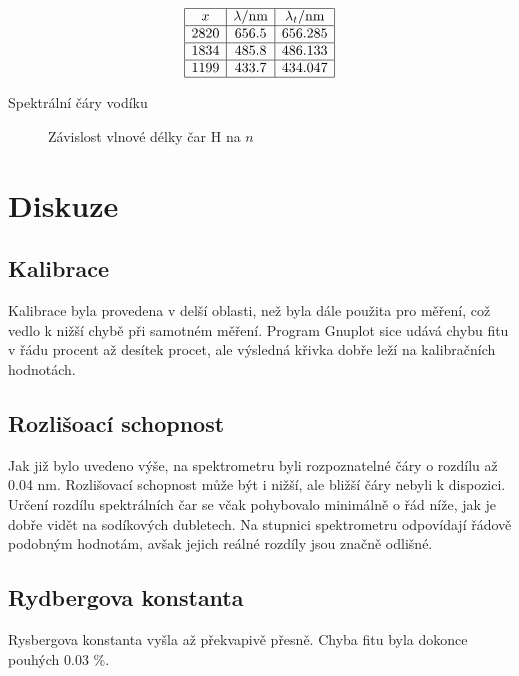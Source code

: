\documentclass[a4paper,12pt]{article}
\begin{document}
\begin{table}
$$
\begin{array}{|c|c|c|}
\hline
x&  \lambda/\mbox{nm}&  \lambda_t/\mbox{nm} \\ \hline
2820&   656.5&  656.285 \\ \hline
1834&   485.8&  486.133 \\ \hline
1199&   433.7&  434.047 \\ \hline
\end{array}
$$
\caption{Spektrální čáry vodíku}
\label{TH}
\end{table}


\begin{figure}[h!]

\caption{Závislost vlnové délky čar H na $n$}
\label{GH}
\end{figure}

\section{Diskuze}
\subsection{Kalibrace}
Kalibrace byla provedena v delší oblasti, než byla dále použita pro měření, což vedlo k nižší chybě při samotném měření. Program Gnuplot sice udává chybu fitu v řádu procent až desítek procet, ale výsledná křivka dobře leží na kalibračních hodnotách.

\subsection{Rozlišoací schopnost}
Jak již bylo uvedeno výše, na spektrometru byli rozpoznatelné čáry o rozdílu až 0.04 nm. Rozlišovací schopnost může být i nižší, ale bližší čáry nebyli k dispozici. Určení rozdílu spektrálních čar se včak pohybovalo minimálně o řád níže, jak je dobře vidět na sodíkových dubletech. Na stupnici spektrometru odpovídají řádově podobným hodnotám, avšak jejich reálné rozdíly jsou značně odlišné.

\subsection{Rydbergova konstanta}
Rysbergova konstanta vyšla až překvapivě přesně. Chyba fitu byla dokonce pouhých 0.03 \%.
\end{document}
